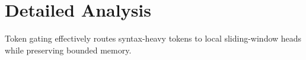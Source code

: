 \section{Detailed Analysis}Token gating effectively routes syntax-heavy tokens to local sliding-window heads while preserving bounded memory.
